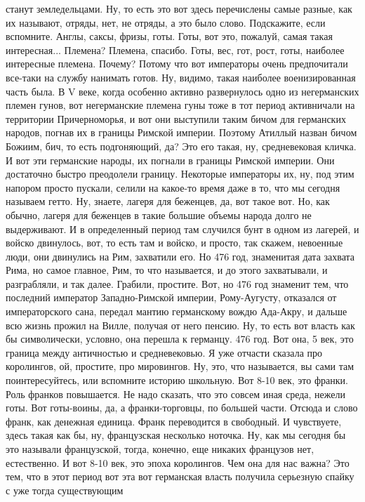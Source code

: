 станут земледельцами. Ну, то есть это вот здесь перечислены самые разные, как их
называют, отряды, нет, не отряды, а это было слово. Подскажите, если вспомните.
Англы, саксы, фризы, готы. Готы, вот это, пожалуй, самая такая интересная...
Племена? Племена, спасибо. Готы, вес, гот, рост, готы, наиболее интересные
племена. Почему? Потому что вот императоры очень предпочитали все-таки на службу
нанимать готов. Ну, видимо, такая наиболее военизированная часть была. В V веке,
когда особенно активно развернулось одно из негерманских племен гунов, вот
негерманские племена гуны тоже в тот период активничали на территории
Причерноморья, и вот они выступили таким бичом для германских народов, погнав их
в границы Римской империи. Поэтому Атиллый назван бичом Божиим, бич, то есть
подгоняющий, да? Это его такая, ну, средневековая кличка. И вот эти германские
народы, их погнали в границы Римской империи. Они достаточно быстро преодолели
границу. Некоторые императоры их, ну, под этим напором просто пускали, селили на
какое-то время даже в то, что мы сегодня называем гетто. Ну, знаете, лагеря для
беженцев, да, вот такое вот. Но, как обычно, лагеря для беженцев в такие большие
объемы народа долго не выдерживают. И в определенный период там случился бунт в
одном из лагерей, и войско двинулось, вот, то есть там и войско, и просто, так
скажем, невоенные люди, они двинулись на Рим, захватили его. Но 476 год,
знаменитая дата захвата Рима, но самое главное, Рим, то что называется, и до
этого захватывали, и разграбляли, и так далее. Грабили, простите. Вот, но 476
год знаменит тем, что последний император Западно-Римской империи, Рому-Аугусту,
отказался от императорского сана, передал мантию германскому вождю Ада-Акру, и
дальше всю жизнь прожил на Вилле, получая от него пенсию. Ну, то есть вот власть
как бы символически, условно, она перешла к германцу. 476 год. Вот она, 5 век,
это граница между античностью и средневековью. Я уже отчасти сказала про
королингов, ой, простите, про мировингов. Ну, это, что называется, вы сами там
поинтересуйтесь, или вспомните историю школьную. Вот 8-10 век, это франки. Роль
франков повышается. Не надо сказать, что это совсем иная среда, нежели готы. Вот
готы-воины, да, а франки-торговцы, по большей части. Отсюда и слово франк, как
денежная единица. Франк переводится в свободный. И чувствуете, здесь такая как
бы, ну, французская несколько ноточка. Ну, как мы сегодня бы это называли
французской, тогда, конечно, еще никаких французов нет, естественно. И вот 8-10
век, это эпоха королингов. Чем она для нас важна? Это тем, что в этот период вот
эта вот германская власть получила серьезную спайку с уже тогда существующим
